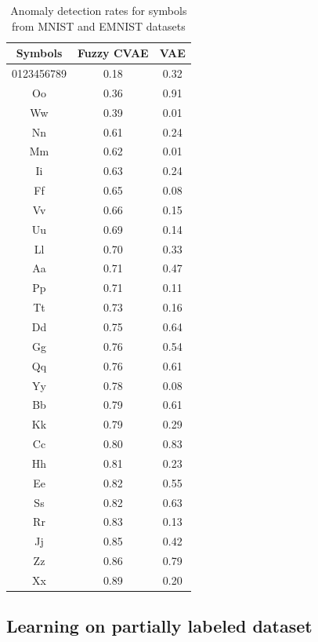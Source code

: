 \documentclass[runningheads]{llncs}
\begin{document}
\begin{table}[h!]
    \centering
    \begin{tabular}{ c c c }
        \hline
        Symbols & Fuzzy CVAE & VAE \\
        \hline\hline
        0123456789 & 0.18 & 0.32 \\
        Oo & 0.36 & 0.91 \\
        Ww & 0.39 & 0.01 \\
        Nn & 0.61 & 0.24 \\
        Mm & 0.62 & 0.01 \\
        Ii & 0.63 & 0.24 \\
        Ff & 0.65 & 0.08 \\
        Vv & 0.66 & 0.15 \\
        Uu & 0.69 & 0.14 \\
        Ll & 0.70 & 0.33 \\
        Aa & 0.71 & 0.47 \\
        Pp & 0.71 & 0.11 \\
        Tt & 0.73 & 0.16 \\
        Dd & 0.75 & 0.64 \\
        Gg & 0.76 & 0.54 \\
        Qq & 0.76 & 0.61 \\
        Yy & 0.78 & 0.08 \\
        Bb & 0.79 & 0.61 \\
        Kk & 0.79 & 0.29 \\
        Cc & 0.80 & 0.83 \\
        Hh & 0.81 & 0.23 \\
        Ee & 0.82 & 0.55 \\
        Ss & 0.82 & 0.63 \\
        Rr & 0.83 & 0.13 \\
        Jj & 0.85 & 0.42 \\
        Zz & 0.86 & 0.79 \\
        Xx & 0.89 & 0.20 \\
    \end{tabular}        
    \caption{Anomaly detection rates for symbols from MNIST and EMNIST datasets}
    \label{table-anomaly}
\end{table}

\subsection{Learning on partially labeled dataset}
\end{document}
